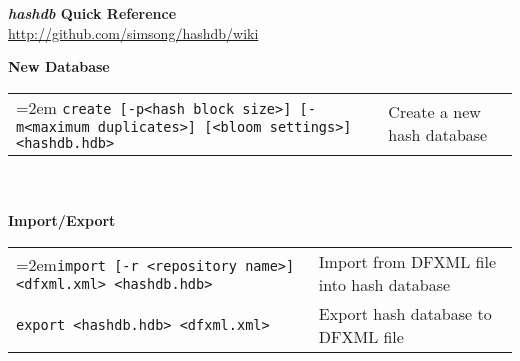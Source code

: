 \documentclass[12pt]{article}
\newcommand{\hdb}{\emph{hashdb}\xspace}
\begin{document}
\begin{center}
\textbf{\Large \hdb Quick Reference} \\
\url{http://github.com/simsong/hashdb/wiki}
\end{center}

\textbf{New Database} \\
\begin{tabular}{p{3.6 in} p{4 in}}
\hangindent=2em \small\texttt{create [-p<hash block size>] [-m<maximum duplicates>] [<bloom settings>] <hashdb.hdb>} &
Create a new hash database \\
\end{tabular}
\\
\\
\textbf{Import/Export} \\
\begin{tabular}{p{3.6 in} p{4 in}}
\hangindent=2em\small\texttt{import [-r <repository name>] <dfxml.xml> <hashdb.hdb>} &
Import from DFXML file into hash database \\
\small\texttt{export <hashdb.hdb> <dfxml.xml>} &
Export hash database to DFXML file \\
\end{tabular}
\\
\\
\end{document}
